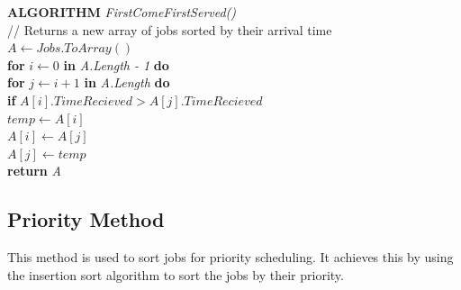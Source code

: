 \documentclass[12pt,a4paper]{article}
\begin{document}
			\textbf{ALGORITHM} \textit{FirstComeFirstServed()}\\
			\null\hspace{1cm}// Returns a new array of jobs sorted by their arrival time\\
			\null\hspace{1cm}\textit{$A \gets Jobs.ToArray()$}\\
			\null\hspace{1cm}\textbf{for} \textit{$i \gets 0$} \textbf{in} \textit{A.Length - 1} \textbf{do}\\
			\null\hspace{2cm}\textbf{for} \textit{$j \gets i + 1$} \textbf{in} \textit{A.Length} \textbf{do}\\
			\null\hspace{3cm}\textbf{if} \textit{$A[i].TimeRecieved > A[j].TimeRecieved$}\\
			\null\hspace{4cm}\textit{$temp \gets A[i]$}\\
			\null\hspace{4cm}\textit{$A[i] \gets A[j]$}\\
			\null\hspace{4cm}\textit{$A[j] \gets temp$}\\
			\null\hspace{1cm}\textbf{return} \textit{A}\\

		\subsection{Priority Method}
			This method is used to sort jobs for priority scheduling. It achieves this by using the 
			insertion sort algorithm to sort the jobs by their priority.\\
\end{document}
